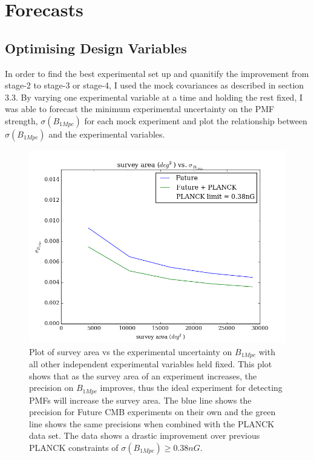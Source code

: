 \section{Forecasts}

\subsection{Optimising Design Variables}

In order to find the best experimental set up and quanitify the improvement from stage-2 to stage-3 or stage-4, I used the mock covariances as described in section 3.3. By varying one experimental variable at a time and holding the rest fixed, I was able to forecast the minimum experimental uncertainty on the PMF strength, $\sigma(B_{1Mpc})$ for each mock experiment and plot the relationship between $\sigma(B_{1Mpc})$ and the experimental variables.


\begin{figure}[h]
\centering
\includegraphics[scale=0.8]{images/area.png}
\caption{Plot of survey area vs the experimental uncertainty on $B_{1Mpc}$ with all other independent experimental variables held fixed. This plot shows that as the survey area of an experiment increases, the precision on $B_{1Mpc}$ improves, thus the ideal experiment for detecting PMFs will increase the survey area. The blue line shows the precision for Future CMB experiments on their own and the green line shows the same precisions when combined with the PLANCK data set. The data shows a drastic improvement over previous PLANCK constraints of $\sigma(B_{1Mpc}) \geq 0.38nG$.}
\label{fig:area}
\end{figure}

